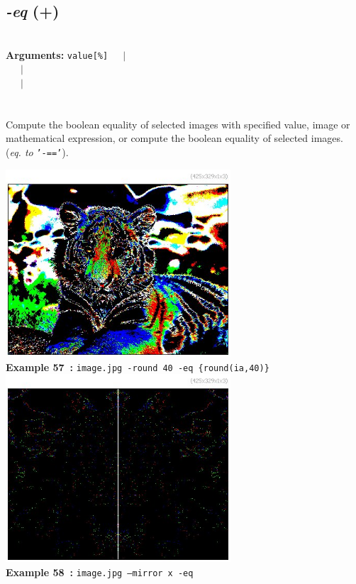 \documentclass[a4paper,11pt,twoside]{book}
\begin{document}
\subsection{\emph{-eq} (+)}\vspace*{-0.5em}
~\\\textbf{Arguments: } 
{\small \texttt{value[\%]}}~~~$|$\\
\hspace*{2.2cm}{\small \texttt{[image]}}~~~$|$\\
~~~$|$\\
\\~\\
Compute the boolean equality of selected images with specified value, image or
mathematical expression, or compute the boolean equality of selected images.
~\\(\emph{eq. to} {\small \texttt{'-=='}}).
\begin{center}\includegraphics[keepaspectratio=true,height=7cm,width=\textwidth]{img/gmic_def57.jpg}\\
{\footnotesize \textbf{Example 57~:} \texttt{image.jpg -round 40 -eq \{round(ia,40)\}}}
\\\includegraphics[keepaspectratio=true,height=7cm,width=\textwidth]{img/gmic_def58.jpg}\\
{\footnotesize \textbf{Example 58~:} \texttt{image.jpg --mirror x -eq}}
\end{center}
\end{document}
